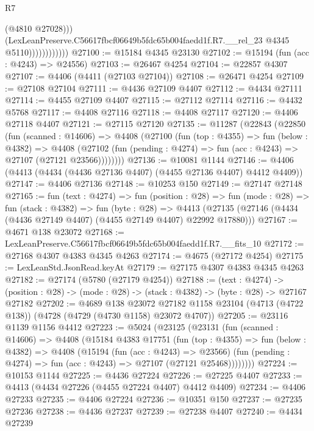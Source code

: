 \begin{lexlean}{R7}
\begin{coremodule}
                              (@4810 @27028)))
                          (LexLeanPreserve.C56617fbcf06649b5fdc65b004faedd1f.R7.__rel_23
                            @4345
                            @5110))))))))))))
@27100 := @15184 @4345 @23130
@27102 := @15194 (fun (acc : @4243) => @24556)
@27103 := @26467 @4254
@27104 := @22857 @4307
@27107 := @4406 (@4411 (@27103 @27104))
@27108 := @26471 @4254
@27109 := @27108 @27104
@27111 := @4436 @27109 @4407
@27112 := @4434 @27111
@27114 := @4455 @27109 @4407
@27115 := @27112 @27114
@27116 := @4432 @5768
@27117 := @4408 @27116
@27118 := @4408 @27117
@27120 := @4406 @27118 @4407
@27121 := @27115 @27120
@27135 := @11287
    (@22843
      (@22850
        (fun (scanned : @14606) =>
        @4408
          (@27100
            (fun (top : @4355) =>
            fun (below : @4382) =>
            @4408
              (@27102 (fun (pending : @4274) => fun (acc : @4243) => @27107 (@27121 @23566))))))))
@27136 := @10081 @1144
@27146 := @4406 (@4413 (@4434 (@4436 @27136 @4407) (@4455 @27136 @4407) @4412 @4409))
@27147 := @4406 @27136
@27148 := @10253 @150
@27149 := @27147 @27148
@27165 := fun (text : @4274) =>
  fun (position : @28) =>
  fun (mode : @28) =>
  fun (stack : @4382) =>
  fun (byte : @28) =>
  @4413 (@27135 (@27146 (@4434 (@4436 @27149 @4407) (@4455 @27149 @4407) @22992 @17880)))
@27167 := @4671 @138 @23072
@27168 := LexLeanPreserve.C56617fbcf06649b5fdc65b004faedd1f.R7.__fits_10
@27172 := @27168 @4307 @4383 @4345 @4263
@27174 := @4675 (@27172 @4254)
@27175 := LexLeanStd.JsonRead.keyAt
@27179 := @27175 @4307 @4383 @4345 @4263
@27182 := @27174 (@5780 (@27179 @4254))
@27188 := (text : @4274) ->
  (position : @28) -> (mode : @28) -> (stack : @4382) -> (byte : @28) -> @27167 @27182
@27202 := @4689
    @138
    @23072
    @27182
    @1158
    @23104
    (@4713 (@4722 @138))
    (@4728 (@4729 (@4730 @1158) @23072 @4707))
@27205 := @23116 @1139 @1156 @4412
@27223 := @5024
    (@23125
      (@23131
        (fun (scanned : @14606) =>
        @4408
          (@15184
            @4383
            @17751
            (fun (top : @4355) =>
            fun (below : @4382) =>
            @4408
              (@15194
                (fun (acc : @4243) => @23566)
                (fun (pending : @4274) => fun (acc : @4243) => @27107 (@27121 @25468))))))))
@27224 := @10153 @1144
@27225 := @4436 @27224
@27226 := @27225 @4407
@27233 := @4413 (@4434 @27226 (@4455 @27224 @4407) @4412 @4409)
@27234 := @4406 @27233
@27235 := @4406 @27224
@27236 := @10351 @150
@27237 := @27235 @27236
@27238 := @4436 @27237
@27239 := @27238 @4407
@27240 := @4434 @27239

\end{coremodule}
\end{lexlean}
